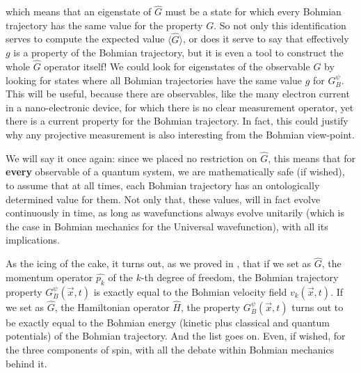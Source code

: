 \documentclass[11pt, a4paper]{article} %
\begin{document}
which means that an eigenstate of $\hat{G}$ must be a state for which every Bohmian trajectory has the same value for the property $G$. So not only this identification serves to compute the expected value $\langle \hat{G} \rangle$, or does it serve to say that effectively $g$ is a property of the Bohmian trajectory, but it is even a tool to construct the whole $\hat{G}$ operator itself! We could look for eigenstates of the observable $G$ by looking for states where all Bohmian trajectories have the same value $g$ for $G_B^\psi$. This will be useful, because there are observables, like the many electron current in a nano-electronic device, for which there is no clear measurement operator, yet there is a current property for the Bohmian trajectory. In fact, this could justify why any projective measurement is also interesting from the Bohmian view-point.

We will say it once again: since we placed no restriction on $\hat{G}$, this means that for {\bf every} observable of a quantum system, we are mathematically safe (if wished), to assume that at all times, each Bohmian trajectory has an ontologically determined value for them. Not only that, these values, will in fact evolve continuously in time, as long as wavefunctions always evolve unitarily (which is the case in Bohmian mechanics for the Universal wavefunction), with all its implications.

As the icing of the cake, it turns out, as we proved in \cite{DevInPosition1}, that if we set as $\hat{G}$, the momentum operator $\hat{p_k}$ of the $k$-th degree of freedom, the Bohmian trajectory property $G^\psi_B(\vec{x},t)$ is exactly equal to the Bohmian velocity field $v_k(\vec{x},t)$. If we set as $\hat{G}$, the Hamiltonian operator $\hat{H}$, the property $G^\psi_B(\vec{x},t)$ turns out to be exactly equal to the Bohmian energy (kinetic plus classical and quantum potentials) of the Bohmian trajectory. And the list goes on. Even, if wished, for the three components of spin, with all the debate within Bohmian mechanics behind it.
\end{document}
